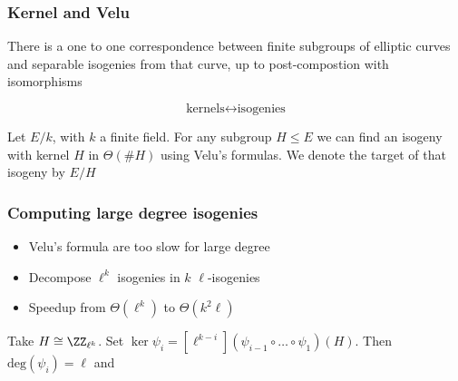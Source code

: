 \documentclass{beamer}
\begin{document}
\begin{frame}
    \frametitle{Kernel and Velu}
    \begin{theorem}
       There is a one to one correspondence between finite subgroups of elliptic curves 
       and separable isogenies from that curve, up to post-compostion with isomorphisms
       
       \[ \text{kernels} \longleftrightarrow \text{isogenies} \]

    \end{theorem}
    
       Let $E/k$, with $k$ a finite field. For any subgroup $H \leq E$ we can find an 
       isogeny with kernel $H$ in $\Theta(\#H)$ using Velu's formulas. We denote the target of 
       that isogeny by $E/H$
    
\end{frame}

\begin{frame}
    \frametitle{Computing large degree isogenies}
    \begin{itemize}
        \item Velu's formula are too slow for large degree
        \item Decompose $\ell^k$ isogenies in $k$ $\ell$-isogenies
        \item Speedup from $\Theta(\ell^k)$ to $\Theta(k^2 \ell)$
    \end{itemize}

    Take $H \cong \ZZ_{\ell^k}$. Set $\ker \psi_i = [\ell^{k - i}](\psi_{i-1} \circ \dots \circ \psi_1)(H)$. 
    Then $\mathrm{deg}(\psi_i) = \ell$ and 

    \begin{center}
    \end{center}

\end{frame}
\end{document}
